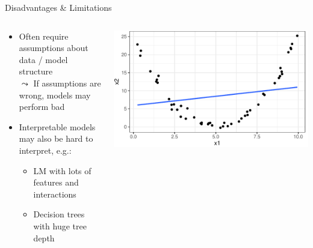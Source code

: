 \documentclass[11pt,compress,t,notes=noshow, aspectratio=169, xcolor=table]{beamer}
\begin{document}
\begin{frame}{Disadvantages \& Limitations}
\begin{columns}[totalwidth=\textwidth]
\begin{column}{0.75\textwidth}
    \begin{itemize}%
    \itemsep1em
        \item<1-> Often require assumptions about data / model structure \\%
        $\leadsto$ If assumptions are wrong, models may perform bad 
        \item<2-> Interpretable models may also be hard to interpret, e.g.:
    \begin{itemize}
        \item LM with lots of features and interactions 
        \item Decision trees with huge tree depth
    \end{itemize}
    \end{itemize}
\end{column}
\begin{column}{0.25\textwidth}
    \begin{center}
        \includegraphics[width = \textwidth]{figure/lm_bad_fit.pdf} 
    \end{center}
\end{column}
\end{columns}
\quad \\


\end{frame}
\end{document}
